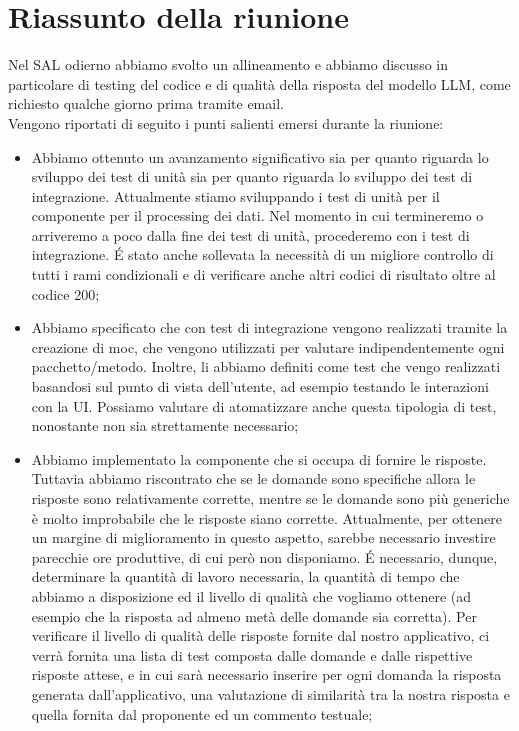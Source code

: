 \section{Riassunto della riunione}
Nel SAL odierno abbiamo svolto un allineamento e abbiamo discusso in particolare di testing del codice e di qualità della risposta del modello LLM, come richiesto qualche giorno prima tramite email. \\
Vengono riportati di seguito i punti salienti emersi durante la riunione:
\begin{itemize}
    \item Abbiamo ottenuto un avanzamento significativo sia per quanto riguarda lo sviluppo dei test di unità sia per quanto riguarda lo sviluppo dei test di integrazione. Attualmente stiamo sviluppando i test di unità per il componente per il processing dei dati. Nel momento in cui termineremo o arriveremo a poco dalla fine dei test di unità, procederemo con i test di integrazione. \'E stato anche sollevata la necessità di un migliore controllo di tutti i rami condizionali e di verificare anche altri codici di risultato oltre al codice 200;
    \item Abbiamo specificato che con test di integrazione vengono realizzati tramite la creazione di moc, che vengono utilizzati per valutare indipendentemente ogni pacchetto/metodo. Inoltre, li abbiamo definiti come test che vengo realizzati basandosi sul punto di vista dell'utente, ad esempio testando le interazioni con la UI. Possiamo valutare di atomatizzare anche questa tipologia di test, nonostante non sia strettamente necessario;
    \item Abbiamo implementato la componente che si occupa di fornire le risposte. Tuttavia abbiamo riscontrato che se le domande sono specifiche allora le risposte sono relativamente corrette, mentre se le domande sono più generiche è molto improbabile che le risposte siano corrette. Attualmente, per ottenere un margine di miglioramento in questo aspetto, sarebbe necessario investire parecchie ore produttive, di cui però non disponiamo. \'E necessario, dunque, determinare la quantità di lavoro necessaria, la quantità di tempo che abbiamo a disposizione ed il livello di qualità che vogliamo ottenere (ad esempio che la risposta ad almeno metà delle domande sia corretta). Per verificare il livello di qualità delle risposte fornite dal nostro applicativo, ci verrà fornita una lista di test composta dalle domande e dalle rispettive risposte attese, e in cui sarà necessario inserire per ogni domanda la risposta generata dall'applicativo, una valutazione di similarità tra la nostra risposta e quella fornita dal proponente ed un commento testuale;

\end{itemize}
